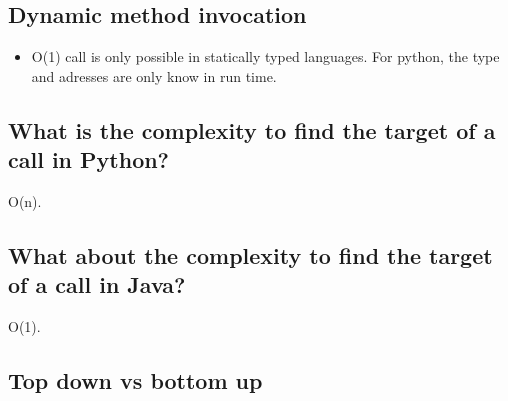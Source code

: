 \documentclass[11pt]{article}
\begin{document}
\subsection{Dynamic method invocation}
\label{sec:org499bd49}
\begin{itemize}
\item O(1) call is only possible in statically typed languages. For python, the type and
adresses are only know in run time.
\end{itemize}
\subsection{What is the complexity to find the target of a call in Python?}
\label{sec:orgf5de3c5}
O(n).
\subsection{What about the complexity to find the target of a call in Java?}
\label{sec:org52eede1}
O(1).
\subsection{Top down vs bottom up}
\label{sec:org9a02a67}
\end{document}

